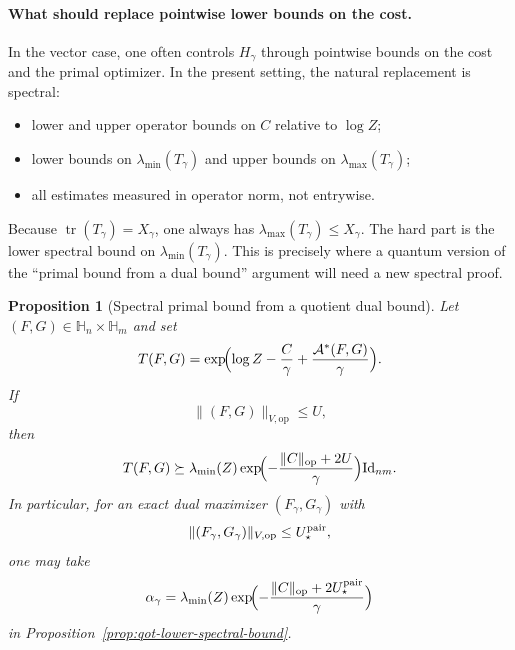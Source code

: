 \documentclass[11pt]{article}
\newcommand{\Id}{\mathrm{Id}}
\newcommand{\tr}{\operatorname{tr}}
\newcommand{\Hh}{\mathbb{H}}
\newcommand{\Aa}{\mathcal{A}}
\newcommand{\op}{\mathrm{op}}
\theoremstyle{plain}
\newtheorem{proposition}{Proposition}[section]
\begin{document}
\paragraph{What should replace pointwise lower bounds on the cost.}
In the vector case, one often controls $H_\gamma$ through pointwise bounds on the cost and the primal optimizer.
In the present setting, the natural replacement is spectral:
\begin{itemize}[leftmargin=1.5em]
\item lower and upper operator bounds on $C$ relative to $\log Z$;
\item lower bounds on $\lambda_{\min}(T_\gamma)$ and upper bounds on $\lambda_{\max}(T_\gamma)$;
\item all estimates measured in operator norm, not entrywise.
\end{itemize}
Because $\tr(T_\gamma)=X_\gamma$, one always has $\lambda_{\max}(T_\gamma)\le X_\gamma$.
The hard part is the lower spectral bound on $\lambda_{\min}(T_\gamma)$.
This is precisely where a quantum version of the ``primal bound from a dual bound'' argument will need a new spectral proof.

\begin{proposition}[Spectral primal bound from a quotient dual bound]
\label{prop:qot-alpha-from-dual}
Let $(F,G)\in \Hh_n\times \Hh_m$ and set
\[
T(F,G)
=
\exp\!\Bigl(
\log Z-\frac{C}{\gamma}+\frac{\Aa^\ast(F,G)}{\gamma}
\Bigr).
\]
If
\[
\|(F,G)\|_{V,\op}\le U,
\]
then
\begin{equation}
\label{eq:qot-alpha-from-dual}
T(F,G)
\succeq
\lambda_{\min}(Z)\exp\!\Bigl(-\frac{\|C\|_{\op}+2U}{\gamma}\Bigr)\Id_{nm}.
\end{equation}
In particular, for an exact dual maximizer $(F_\gamma,G_\gamma)$ with
\[
\|(F_\gamma,G_\gamma)\|_{V,\op}\le U_\star^{\rm pair},
\]
one may take
\begin{equation}
\label{eq:qot-alpha-from-pairU}
\alpha_\gamma
=
\lambda_{\min}(Z)\exp\!\Bigl(-\frac{\|C\|_{\op}+2U_\star^{\rm pair}}{\gamma}\Bigr)
\end{equation}
in Proposition~\ref{prop:qot-lower-spectral-bound}.
\end{proposition}
\end{document}
